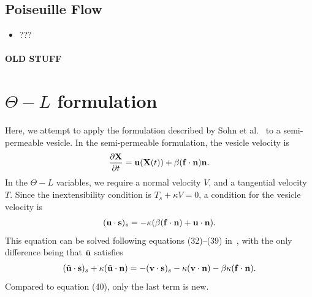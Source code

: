 \documentclass[aps,prl,showpacs]{revtex4}
\newif\ifTikz
\begin{document}
\ifTikz

\fi

\subsection{Poiseuille Flow}
\begin{itemize}
  \item ???
\end{itemize}



 
 




 \newpage
 \paragraph{\bf \Huge OLD STUFF}

\section{{$\Theta-L$} formulation}
Here, we attempt to apply the formulation described by Sohn et
al.~\cite{soh-tse-li-voi-low2010} to a semi-permeable vesicle.  In the
semi-permeable formulation, the vesicle velocity is
\begin{align}
  \frac{\partial \mathbf{X}}{\partial t} = \mathbf{u}(\mathbf{X}(t)) + \beta (\mathbf{f} \cdot \mathbf{n}) \mathbf{n}.
\end{align}
In the {$\Theta-L$} variables, we require a normal velocity $V$, and a
tangential velocity $T$. Since the inextensibility condition is $T_s +
\kappa V = 0$, a condition for the vesicle velocity is
\begin{align}
  (\mathbf{u} \cdot \mathbf{s})_s = -\kappa(\beta (\mathbf{f} \cdot \mathbf{n}) + 
      \mathbf{u} \cdot \mathbf{n}).
\end{align}
This equation can be solved following equations (32)--(39)
in~\cite{soh-tse-li-voi-low2010}, with the only difference being that
$\tilde{\mathbf{u}}$ satisfies
\begin{align}
  (\tilde{\mathbf{u}} \cdot \mathbf{s})_s + \kappa(\tilde{\mathbf{u}} \cdot \mathbf{n}) =
    -(\mathbf{v} \cdot \mathbf{s})_s - \kappa(\mathbf{v} \cdot \mathbf{n}) 
    - \beta\kappa(\mathbf{f} \cdot \mathbf{n}).
\end{align}
Compared to equation (40), only the last term is new.
\end{document}
